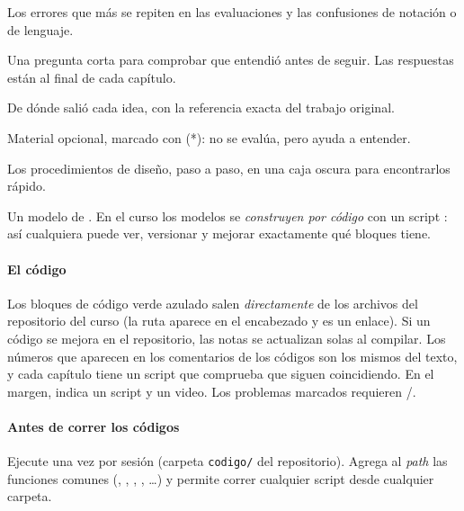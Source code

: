\begin{cuidado}
Los errores que más se repiten en las evaluaciones y las confusiones de notación o de lenguaje.
\end{cuidado}

\begin{pausa}[title={\textcolor{ctrlverde}{\faPauseCircle}\hspace{0.45em}Pausa activa 10.3}]
Una pregunta corta para comprobar que entendió antes de seguir. Las respuestas están al final de cada capítulo.
\end{pausa}

\begin{historia}
De dónde salió cada idea, con la referencia exacta del trabajo original.
\end{historia}

\begin{profundiza}
Material opcional, marcado con (*): no se evalúa, pero ayuda a entender.
\end{profundiza}

\begin{receta}[Procedimiento]
Los procedimientos de diseño, paso a paso, en una caja oscura para encontrarlos rápido.
\end{receta}

\begin{modelo}
Un modelo de \simulink. En el curso los modelos se \emph{construyen por código} con un script : así cualquiera puede ver, versionar y mejorar exactamente qué bloques tiene.
\end{modelo}

\paragraph{El código}
Los bloques de código verde azulado salen \emph{directamente} de los archivos del repositorio del curso (la ruta aparece en el encabezado y es un enlace). Si un código se mejora en el repositorio, las notas se actualizan solas al compilar. Los números que aparecen en los comentarios de los códigos son los mismos del texto, y cada capítulo tiene un script  que comprueba que siguen coincidiendo. En el margen, \textcolor{ctrlteal}{\faFileCode} indica un script y \textcolor{ctrlcoral}{\faPlayCircle} un video. Los problemas marcados \etiquetaM{} requieren \matlab/\simulink.

\paragraph{Antes de correr los códigos}
Ejecute una vez por sesión  (carpeta \texttt{codigo/} del repositorio). Agrega al \emph{path} las funciones comunes (, , , , \ldots) y permite correr cualquier script desde cualquier carpeta.

